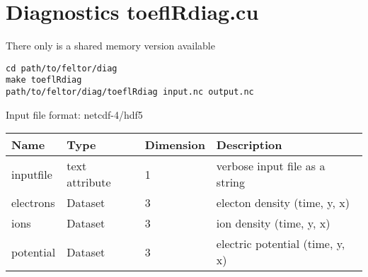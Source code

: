 \documentclass{hitec}
\begin{document}
\section{Diagnostics toeflRdiag.cu}
There only is a shared memory version available
\begin{verbatim}
cd path/to/feltor/diag
make toeflRdiag 
path/to/feltor/diag/toeflRdiag input.nc output.nc
\end{verbatim}

Input file format: netcdf-4/hdf5
%
\begin{longtable}{lll>{\RaggedRight}p{7cm}}
\toprule
\rowcolor{gray!50}\textbf{Name} &  \textbf{Type} & \textbf{Dimension} & \textbf{Description}  \\ \midrule
inputfile  &             text attribute & 1 & verbose input file as a string \\
electrons                & Dataset & 3 & electon density (time, y, x) \\
ions                     & Dataset & 3 & ion density (time, y, x) \\
potential                & Dataset & 3 & electric potential (time, y, x) \\
\bottomrule
\end{longtable}
\end{document}
